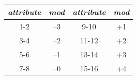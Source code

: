 \begin{center}
\begin{tabular}{ c c | c c }
  \emph{attribute} & \emph{mod} & \emph{attribute} & \emph{mod} \\
  \hline
  1-2 & --3 & 9-10 & +1 \\
  3-4 & --2 & 11-12 & +2 \\
  5-6 & --1 & 13-14 & +3 \\
  7-8 & --0 & 15-16 & +4
\end{tabular}
\end{center}
